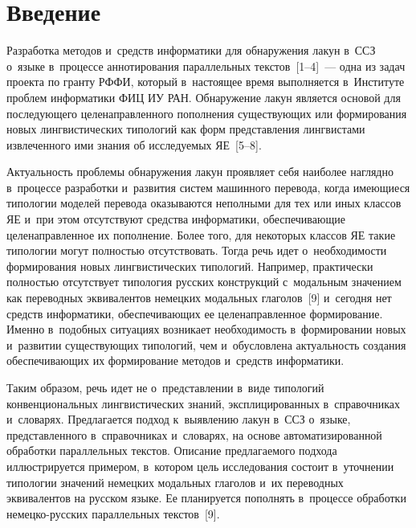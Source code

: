   



\thispagestyle{headings}

\begin{multicols}{2}

\label{st\stat}
   
\section{Введение}

\vspace*{-2pt}
    
  Разработка методов и~средств информатики для обнаружения лакун 
  в~ССЗ о~языке в~процессе аннотирования 
параллельных текстов~[1--4]~--- одна из задач проекта по гранту РФФИ, 
который в~настоящее время выполняется в~Институте проблем информатики 
ФИЦ ИУ РАН. Обнаружение лакун является основой для последующего 
целенаправленного пополнения существующих или формирования новых 
лингвистических типологий как форм представления лингвистами 
извлеченного ими знания об исследуемых ЯЕ~[5--8].
  
  Актуальность проблемы обнаружения лакун проявляет себя наиболее 
наглядно в~процессе разработки и~развития систем машинного перевода, когда 
имеющиеся типологии моделей перевода оказываются неполными для тех или 
иных классов ЯЕ и~при этом отсутствуют средства информатики, 
обеспечивающие целенаправленное их пополнение. Более того, для некоторых 
классов ЯЕ такие типологии могут пол\-ностью отсутствовать. 
Тогда речь идет о~не\-об\-хо\-ди\-мости формирования новых лингвистических 
типологий. Например, практически пол\-ностью отсутствует типология русских 
конструкций с~модальным значением как переводных эквивалентов немецких 
модальных глаголов~[9] и~сегодня нет средств информатики, обес\-пе\-чи\-ва\-ющих 
ее целенаправленное формирование. Именно в~подобных ситуациях возникает 
необходимость в~формировании новых и~развитии существующих типологий, 
чем и~обусловлена актуальность создания обеспечивающих их формирование 
методов и~средств информатики.
  
  Таким образом, речь идет не о~представлении в~виде типологий 
конвенциональных лингвистических знаний, эксплицированных 
в~справочниках и~словарях. Предлагается подход к~выявлению лакун в~ССЗ
 о~языке, представленного в~справочниках и~словарях, на 
основе автоматизированной обработки параллельных текстов. Описание 
предлагаемого подхода иллюстрируется примером, в~котором цель 
исследования состоит в~уточнении типологии значений немецких модальных 
глаголов и~их переводных эквивалентов на русском языке. Ее планируется 
пополнять в~процессе обработки не\-мец\-ко-рус\-ских параллельных 
текстов~[9].


\end{multicols}
